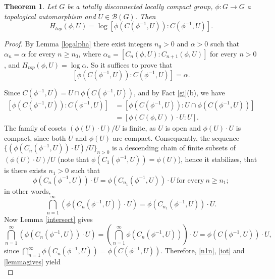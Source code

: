 \documentclass[11pt]{article}
\newtheorem{theorem}{Theorem}[section]
\theoremstyle{definition}
\numberwithin{equation}{section}
\begin{document}
\begin{theorem}\label{lf+}
Let $G$ be a totally disconnected locally compact group, $\phi:G\to G$ a topological automorphism and $U\in\mathcal B(G)$. Then 
$$H_{top}(\phi,U)=\log[\phi(C(\phi^{-1},U)):C(\phi^{-1},U)].$$
\end{theorem}
\begin{proof}
By Lemma \ref{logalpha} there exist integers $n_0>0$ and $\alpha> 0$ such that $\alpha_n=\alpha$ for every $n\geq n_0$, where $\alpha_{n}=[C_{n}(\phi,U):C_{n+1}(\phi,U)]$ for every $n>0$, and $H_{top}(\phi,U)=\log\alpha$. So it suffices to prove that 
\begin{equation}\label{aim}
[\phi(C(\phi^{-1},U)):C(\phi^{-1},U)]=\alpha.
\end{equation}

Since $C(\phi^{-1},U)=U\cap \phi(C(\phi^{-1},U))$, and by Fact \ref{gi}(b), we have
\begin{equation}\label{eqa}\begin{split}
[\phi(C(\phi^{-1},U)):C(\phi^{-1},U)]&=[\phi(C(\phi^{-1},U)):U\cap \phi(C(\phi^{-1},U))]\\&=[\phi(C(\phi,U))\cdot U:U].
\end{split}\end{equation}
The family of cosets $(\phi(U)\cdot U)/U$ is finite, as $U$ is open and $\phi(U)\cdot U$ is compact, since both $U$ and $\phi(U)$ are compact. Consequently, the sequence $\{(\phi(C_n(\phi^{-1},U))\cdot U)/U\}_{n>0}$ is a descending chain of finite subsets of $(\phi(U)\cdot U)/U$ (note that $\phi(C_1(\phi^{-1},U))=\phi(U)$), hence it stabilizes, that is there exists $n_1>0$ such that 
\begin{equation}\label{n1n}
\phi(C_n(\phi^{-1},U))\cdot U=\phi(C_{n_1}(\phi^{-1},U))\cdot U\ \text{for every}\ n\geq n_1;
\end{equation}
in other words, 
\begin{equation}\label{iot}
\bigcap_{n=1}^\infty (\phi(C_{n}(\phi^{-1},U))\cdot U)=\phi(C_{n_1}(\phi^{-1},U))\cdot U.
\end{equation}
Now Lemma \ref{intersect} gives
\begin{equation}\label{lemmagives}
\bigcap_{n=1}^\infty (\phi(C_{n}(\phi^{-1},U))\cdot U)=\left(\bigcap_{n=1}^\infty \phi(C_n(\phi^{-1},U))\right)\cdot U=\phi(C(\phi^{-1},U))\cdot U,
\end{equation}
since $\bigcap_{n=1}^\infty \phi(C_n(\phi^{-1},U))=\phi(C(\phi^{-1},U))$. 
Therefore, \eqref{n1n}, \eqref{iot} and \eqref{lemmagives} yield
\begin{equation}\label{eqb}

\end{equation}
\end{proof}
\end{document}
